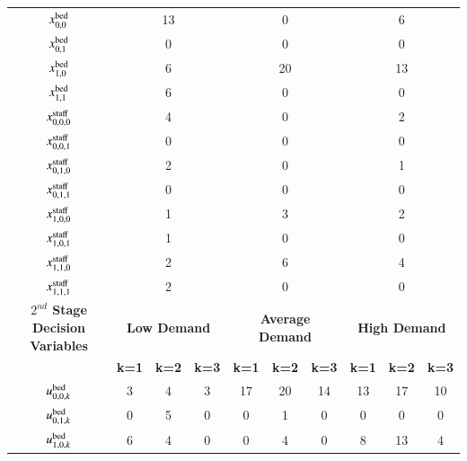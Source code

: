 \documentclass[../thesis.tex]{subfiles}
\begin{document}
\begin{landscape}
\begin{table}[h!]
{\begin{tabular}{cccccccccc}
    $x^\textnormal{bed}_{0,0}$        &\multicolumn{3}{c}{13}  &\multicolumn{3}{c}{0}    &\multicolumn{3}{c}{6}    \\
    $x^\textnormal{bed}_{0,1}$        &\multicolumn{3}{c}{0}  &\multicolumn{3}{c}{0}    &\multicolumn{3}{c}{0}    \\
    $x^\textnormal{bed}_{1,0}$        &\multicolumn{3}{c}{6}  &\multicolumn{3}{c}{20}    &\multicolumn{3}{c}{13}    \\
    $x^\textnormal{bed}_{1,1}$        &\multicolumn{3}{c}{6} &\multicolumn{3}{c}{0}   &\multicolumn{3}{c}{0}   \\ \midrule
    $x^\textnormal{staff}_{0,0,0}$    &\multicolumn{3}{c}{4} &\multicolumn{3}{c}{0} &\multicolumn{3}{c}{2} \\
    $x^\textnormal{staff}_{0,0,1}$    &\multicolumn{3}{c}{0}  &\multicolumn{3}{c}{0}  &\multicolumn{3}{c}{0}  \\
    $x^\textnormal{staff}_{0,1,0}$    &\multicolumn{3}{c}{2}  &\multicolumn{3}{c}{0} &\multicolumn{3}{c}{1} \\
    $x^\textnormal{staff}_{0,1,1}$    &\multicolumn{3}{c}{0}  &\multicolumn{3}{c}{0}  &\multicolumn{3}{c}{0}  \\
    $x^\textnormal{staff}_{1,0,0}$    &\multicolumn{3}{c}{1}  &\multicolumn{3}{c}{3}  &\multicolumn{3}{c}{2}  \\
    $x^\textnormal{staff}_{1,0,1}$    &\multicolumn{3}{c}{1} &\multicolumn{3}{c}{0} & \multicolumn{3}{c}{0}\\
    $x^\textnormal{staff}_{1,1,0}$    &\multicolumn{3}{c}{2}  &\multicolumn{3}{c}{6}  &\multicolumn{3}{c}{4}  \\
    $x^\textnormal{staff}_{1,1,1}$    &\multicolumn{3}{c}{2}  &\multicolumn{3}{c}{0}  & \multicolumn{3}{c}{0} \\ \midrule
     \textbf{$2^{nd}$ Stage Decision Variables} & \multicolumn{3}{c}{\textbf{Low Demand}} & \multicolumn{3}{c}{\textbf{Average Demand}} & \multicolumn{3}{c}{\textbf{High Demand}} \\
     & \textbf{k=1} & \textbf{k=2} & \textbf{k=3}& \textbf{k=1} & \textbf{k=2} & \textbf{k=3}& \textbf{k=1} & \textbf{k=2} & \textbf{k=3}\\
     \midrule
    $u^\textnormal{bed}_{0,0,k}$     & 3 & 4  & 3  &  17 & 20  & 14  & 13  &  17 &  10 \\
    $u^\textnormal{bed}_{0,1,k}$     & 0  & 5  & 0  &  0&  1 &  0 & 0  & 0  &   0\\
    $u^\textnormal{bed}_{1,0,k}$     & 6 & 4  & 0  &  0 & 4  &  0 & 8  & 13  & 4  \\

\end{tabular}}
\end{table}
\end{landscape}
\end{document}
